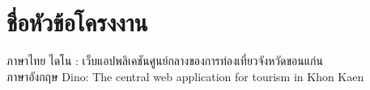 \section{ชื่อหัวข้อโครงงาน}
\hspace*{1cm} ภาษาไทย \hspace{1cm} ไดโน : เว็บแอปพลิเคชันศูนย์กลางของการท่องเที่ยวจังหวัดขอนแก่น\\
\hspace*{1cm} ภาษาอังกฤษ \hspace{0.8cm} Dino: The central web application for tourism in Khon Kaen
